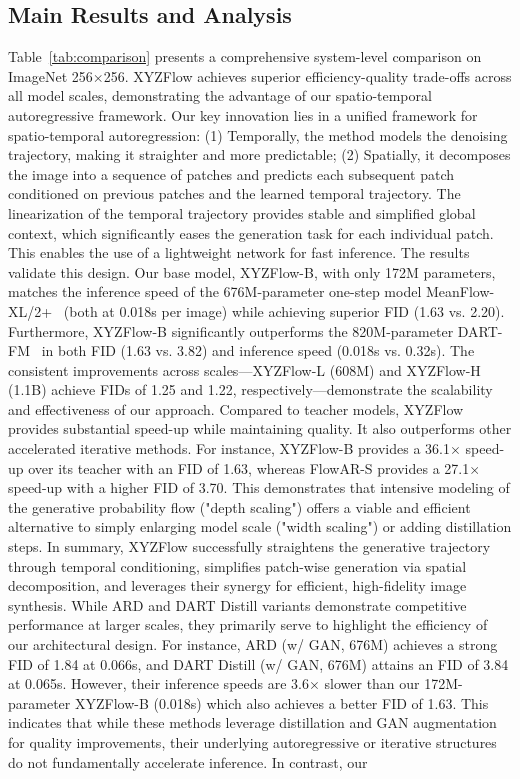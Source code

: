 \documentclass{article}
\theoremstyle{plain}
\theoremstyle{definition}
\theoremstyle{remark}
\begin{document}
\vspace{-2mm}
\subsection{Main Results and Analysis}
\label{subsec:qualitative}
\vspace{-2mm}

Table~\ref{tab:comparison} presents a comprehensive system-level comparison on ImageNet 256$\times$256. XYZFlow achieves superior efficiency-quality trade-offs across all model scales, demonstrating the advantage of our spatio-temporal autoregressive framework. Our key innovation lies in a unified framework for spatio-temporal autoregression: (1) Temporally, the method models the denoising trajectory, making it straighter and more predictable; (2) Spatially, it decomposes the image into a sequence of patches and predicts each subsequent patch conditioned on previous patches and the learned temporal trajectory. The linearization of the temporal trajectory provides stable and simplified global context, which significantly eases the generation task for each individual patch. This enables the use of a lightweight network for fast inference. The results validate this design. Our base model, XYZFlow-B, with only 172M parameters, matches the inference speed of the 676M-parameter one-step model MeanFlow-XL/2+~\cite{geng2025mean} (both at 0.018s per image) while achieving superior FID (1.63 vs. 2.20). Furthermore, XYZFlow-B significantly outperforms the 820M-parameter DART-FM~\cite{gu2024dartdenoisingautoregressivetransformer} in both FID (1.63 vs. 3.82) and inference speed (0.018s vs. 0.32s). The consistent improvements across scales—XYZFlow-L (608M) and XYZFlow-H (1.1B) achieve FIDs of 1.25 and 1.22, respectively—demonstrate the scalability and effectiveness of our approach. Compared to teacher models, XYZFlow provides substantial speed-up while maintaining quality. It also outperforms other accelerated iterative methods. For instance, XYZFlow-B provides a 36.1$\times$ speed-up over its teacher with an FID of 1.63, whereas FlowAR-S provides a 27.1$\times$ speed-up with a higher FID of 3.70. This demonstrates that intensive modeling of the generative probability flow ("depth scaling") offers a viable and efficient alternative to simply enlarging model scale ("width scaling") or adding distillation steps. In summary, XYZFlow successfully straightens the generative trajectory through temporal conditioning, simplifies patch-wise generation via spatial decomposition, and leverages their synergy for efficient, high-fidelity image synthesis. While ARD and DART Distill variants demonstrate competitive performance at larger scales, they primarily serve to highlight the efficiency of our architectural design. For instance, ARD (w/ GAN, 676M) achieves a strong FID of 1.84 at 0.066s, and DART Distill (w/ GAN, 676M) attains an FID of 3.84 at 0.065s. However, their inference speeds are 3.6$\times$ slower than our 172M-parameter XYZFlow-B (0.018s) which also achieves a better FID of 1.63. This indicates that while these methods leverage distillation and GAN augmentation for quality improvements, their underlying autoregressive or iterative structures do not fundamentally accelerate inference. In contrast, our 
\end{document}
